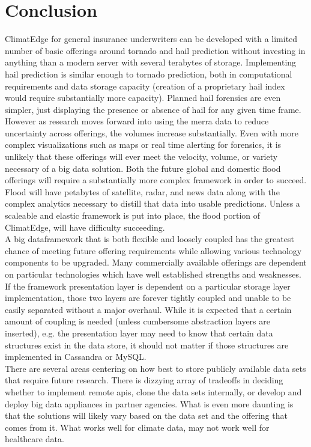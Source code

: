 \section{Conclusion}
ClimatEdge\texttrademark{} for general insurance underwriters can be developed with a limited number of basic offerings around tornado and hail prediction without investing in anything than a modern server with several terabytes of storage. Implementing hail prediction is similar enough to tornado prediction, both in computational requirements and data storage capacity (creation of a proprietary hail index would require substantially more capacity). Planned hail forensics are even simpler, just displaying the presence or absence of hail for any given time frame. However as research moves forward into using the \gls{merra} data to reduce uncertainty across offerings, the volumes increase substantially. Even with more complex visualizations such as maps or real time alerting for forensics, it is unlikely that these offerings will ever meet the velocity, volume, or variety necessary of a big data solution. Both the future global and domestic flood offerings will require a substantially more complex framework in order to succeed. Flood will have petabytes of satellite, radar, and news data along with the complex analytics necessary to distill that data into usable predictions. Unless a scaleable and elastic framework is put into place, the flood portion of ClimatEdge\texttrademark{}, will have difficulty succeeding.\\

A big dataframework that is both flexible and loosely coupled has the greatest chance of meeting future offering requirements while allowing various technology components to be upgraded. Many commercially available offerings are dependent on particular technologies which have well established strengths and weaknesses. If the framework presentation layer is dependent on a particular storage layer implementation, those two layers are forever tightly coupled and unable to be easily separated without a major overhaul. While it is expected that a certain amount of coupling is needed (unless cumbersome abstraction layers are inserted), e.g. the presentation layer may need to know that certain data structures exist in the data store, it should not matter if those structures are implemented in Cassandra or MySQL.\\

There are several areas centering on how best to store publicly available data sets that require future research. There is dizzying array of tradeoffs in deciding whether to implement remote \gls{api}s, clone the data sets internally, or develop and deploy big data appliances in partner agencies. What is even more daunting is that the solutions will likely vary based on the data set and the offering that comes from it. What works well for climate data, may not work well for healthcare data.\\

